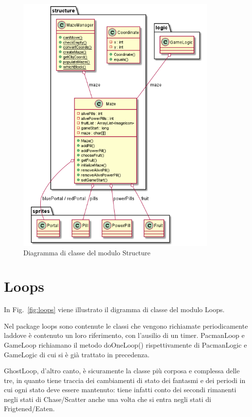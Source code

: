 \documentclass[12pt,a4paper]{report}
\begin{document}
\begin{figure}[tb]
\begin{center}
  \includegraphics[width=10cm]{structure}
\end{center}
  \caption{Diagramma di classe del modulo Structure}
  \label{fig:structure}
\end{figure}



\section{Loops}\label{se:arch.loops}
In Fig.~\ref{fig:loops} viene illustrato il digramma di classe del modulo Loops.\newline

Nel package loops sono contenute le classi che vengono richiamate periodicamente laddove è contenuto un loro riferimento, con l’ausilio di un timer. PacmanLoop e GameLoop richiamano il metodo doOneLoop() rispettivamente di PacmanLogic e GameLogic di cui si è già trattato in precedenza.

GhostLoop, d’altro canto, è sicuramente la classe più corposa e complessa delle tre, in quanto tiene traccia dei cambiamenti di stato dei fantasmi e dei periodi in cui ogni stato deve essere mantenuto: tiene infatti conto dei secondi rimanenti negli stati di Chase/Scatter anche una volta che si entra negli stati di Frigtened/Eaten.
\end{document}
